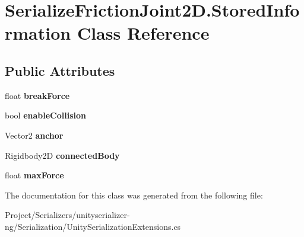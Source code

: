 \hypertarget{class_serialize_friction_joint2_d_1_1_stored_information}{}\section{Serialize\+Friction\+Joint2\+D.\+Stored\+Information Class Reference}
\label{class_serialize_friction_joint2_d_1_1_stored_information}
\subsection*{Public Attributes}
\begin{DoxyCompactItemize}
\item 
\mbox{\label{class_serialize_friction_joint2_d_1_1_stored_information_aba70a1c821f52601eaafc21e0ae6b674}} 
float {\bfseries break\+Force}
\item 
\mbox{\label{class_serialize_friction_joint2_d_1_1_stored_information_ad8900f24a11819c9477370375bdfcc40}} 
bool {\bfseries enable\+Collision}
\item 
\mbox{\label{class_serialize_friction_joint2_d_1_1_stored_information_aca1a9636f30074869783fd1d9aae6bcb}} 
Vector2 {\bfseries anchor}
\item 
\mbox{\label{class_serialize_friction_joint2_d_1_1_stored_information_af141dede638bd1b001399edfed6fa1a4}} 
Rigidbody2D {\bfseries connected\+Body}
\item 
\mbox{\label{class_serialize_friction_joint2_d_1_1_stored_information_ac621427c3759cb98231c024d4f3559a5}} 
float {\bfseries max\+Force}
\end{DoxyCompactItemize}


The documentation for this class was generated from the following file\+:\begin{DoxyCompactItemize}
\item 
Project/\+Serializers/unityserializer-\/ng/\+Serialization/Unity\+Serialization\+Extensions.\+cs\end{DoxyCompactItemize}
